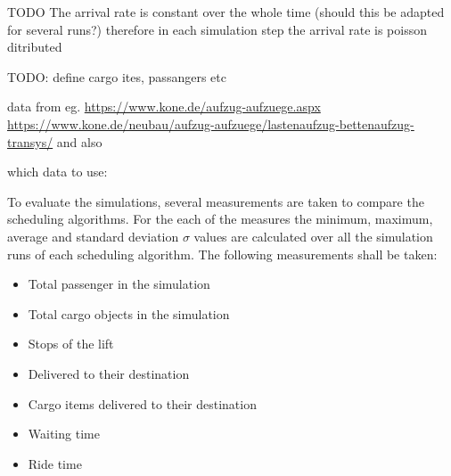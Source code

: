 TODO
The arrival rate is constant over the whole time (should this be adapted for several runs?)
therefore in each simulation step the arrival rate is poisson ditributed

TODO: define cargo ites, passangers etc

data from eg. \url{https://www.kone.de/aufzug-aufzuege.aspx} \url{https://www.kone.de/neubau/aufzug-aufzuege/lastenaufzug-bettenaufzug-transys/}
and also \autocite[][p.~349]{barney2016handbook}

which data to use: \autocite[][p.~347]{barney2016handbook}


To evaluate the simulations, several measurements are taken to compare the scheduling algorithms.
For the each of the measures the minimum, maximum, average and standard deviation $ \sigma{} $ values are calculated over all the simulation runs of each scheduling algorithm.  
The following measurements shall be taken:
\begin{samepage}
\begin{itemize}
    \item Total passenger in the simulation
    \item Total cargo objects in the simulation
    \item Stops of the lift
    \item Delivered to their destination
    \item Cargo items delivered to their destination
    \item Waiting time
    \item Ride time
\end{itemize}
\end{samepage}
 

